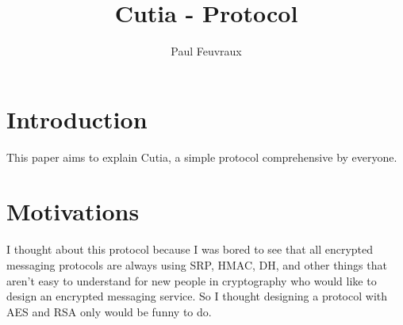 \documentclass[a4paper,10pt]{article}
\title{Cutia - Protocol}
\author{Paul Feuvraux}
\begin{document}
\maketitle

\section{Introduction}
This paper aims to explain Cutia, a simple protocol comprehensive by everyone.

\section{Motivations}
I thought about this protocol because I was bored to see that all encrypted messaging protocols are always using SRP, HMAC, DH, and other things that aren't easy to understand for new people in cryptography who would like to design an encrypted messaging service. So I thought designing a protocol with AES and RSA only would be funny to do.
\end{document}
